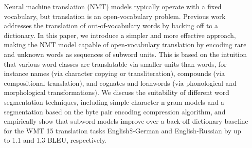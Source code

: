 Neural machine translation (NMT) models typically operate with a fixed vocabulary, but translation is an open-vocabulary problem. Previous work addresses the translation of out-of-vocabulary words by backing off to a dictionary. In this paper, we introduce a simpler and more effective approach, making the NMT model capable of open-vocabulary translation by encoding rare and unknown words as sequences of subword units. This is based on the intuition that various word classes are translatable via smaller units than words, for instance names (via character copying or transliteration), compounds (via compositional translation), and cognates and loanwords (via phonological and morphological transformations). We discuss the suitability of different word segmentation techniques, including simple character n-gram models and a segmentation based on the byte pair encoding compression algorithm, and empirically show that subword models improve over a back-off dictionary baseline for the WMT 15 translation tasks English\$-German and English-Russian by up to 1.1 and 1.3 BLEU, respectively.
